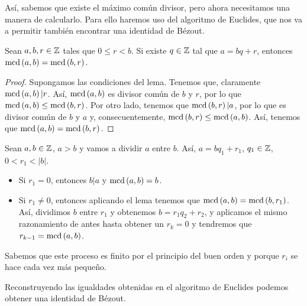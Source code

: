 Así, sabemos que existe el máximo común divisor, pero ahora necesitamos una manera de calcularlo. Para ello haremos uso del algoritmo de Euclides, que nos va a permitir también encontrar una identidad de Bézout.
\begin{lema}
Sean $\displaystyle a,b,r \in \mathbb{Z} $ tales que $\displaystyle 0 \leq r < b $. Si existe $\displaystyle q \in \mathbb{Z} $ tal que $\displaystyle a = bq + r $, entonces $\displaystyle \text{mcd}\left(a,b\right) = \text{mcd}\left(b,r\right) $.
\end{lema}
\begin{proof}
Supongamos las condiciones del lema. Tenemos que, claramente $\displaystyle \text{mcd}\left(a,b\right) | r $. Así, $\displaystyle \text{mcd}\left(a,b\right) $ es divisor común de $\displaystyle b $ y $\displaystyle r $, por lo que $\displaystyle \text{mcd}\left(a,b\right) \leq \text{mcd}\left(b,r\right) $. Por otro lado, tenemos que $\displaystyle \text{mcd}\left(b,r\right) | a $, por lo que es divisor común de $\displaystyle b $ y $\displaystyle a $ y, consecuentemente, $\displaystyle \text{mcd}\left(b,r\right)\leq \text{mcd}\left(a,b\right) $. Así, tenemos que $\displaystyle \text{mcd}\left(a,b\right) = \text{mcd}\left(b,r\right) $.
\end{proof}

\begin{theorem}
Sean $\displaystyle a,b \in \mathbb{Z}$, $\displaystyle a > b $ y vamos a dividir $\displaystyle a $ entre $\displaystyle b $. Así, $\displaystyle a = bq_{1} + r_{1} $, $\displaystyle q_{1} \in \mathbb{Z} $, $\displaystyle 0 < r_{1} < \left|b\right| $. 
\begin{itemize}
\item Si $\displaystyle r_{1} = 0 $, entonces $\displaystyle b | a $ y $\displaystyle \text{mcd}\left(a,b\right) = b $. 
\item Si $\displaystyle r_{1} \neq 0 $, entonces aplicando el lema tenemos que $\displaystyle \text{mcd}\left(a,b\right) = \text{mcd}\left(b, r_{1}\right) $. Así, dividimos $\displaystyle b $ entre $\displaystyle r_{1} $ y obtenemos $\displaystyle b = r_{1}q_{2}+r_{2} $, y aplicamos el mismo razonamiento de antes hasta obtener un $\displaystyle r_{k} = 0 $ y tendremos que $\displaystyle r_{k-1} = \text{mcd}\left(a,b\right) $.
\end{itemize}
 Sabemos que este proceso es finito por el principio del buen orden y porque $\displaystyle r_{i} $ se hace cada vez más pequeño.
\end{theorem}
Reconstruyendo las igualdades obtenidas en el algoritmo de Euclides podemos obtener una identidad de Bézout.
